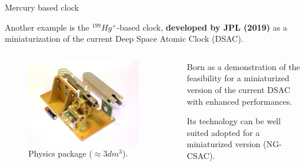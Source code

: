\begin{frame}{Mercury based clock}

    Another example is the $^{199}Hg^+$-based clock, \textbf{developed by JPL (2019)} as a miniaturization of the current Deep Space Atomic Clock (DSAC).

    \vspace{10pt}

    \begin{columns}[c, onlytextwidth]

        \begin{column}{0.4\textwidth}

            \begin{figure}
                \centering
                \includegraphics[width=0.9\textwidth]{img/Mercury-clock.jpg}
                \caption{Physics package ($\approx 3dm^3$).}
            \end{figure}

        \end{column}

        \hfill

        \begin{column}{0.55\textwidth}

            Born as a demonstration of the feasibility for a miniaturized version of the current DSAC with enhanced performances.

            \vspace{10pt}

            Its technology can be well suited adopted for a miniaturized version (NG-CSAC).

        \end{column}

    \end{columns}

\end{frame}



